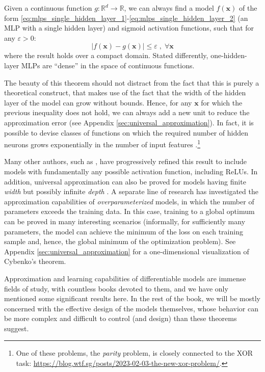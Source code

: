 \begin{theorem}
Given a continuous function $g: \mathbb{R}^d \rightarrow \mathbb{R}$, we can always find a model $f(\mathbf{x})$ of the form \eqref{eq:mlps_single_hidden_layer_1}-\eqref{eq:mlps_single_hidden_layer_2} (an MLP with a single hidden layer) and sigmoid activation functions, such that for any $\varepsilon > 0$:
%
$$
\lvert f(\mathbf{x}) - g(\mathbf{x})\rvert\le\varepsilon \;,\;\forall \mathbf{x}
$$
%
where the result holds over a compact domain. Stated differently, one-hidden-layer MLPs are “dense” in the space of continuous functions.
\end{theorem}

The beauty of this theorem should not distract from the fact that this is purely a theoretical construct, that makes use of the fact that the width of the hidden layer of the model can grow without bounds. Hence, for any $\mathbf{x}$ for which the previous inequality does not hold, we can always add a new unit to reduce the approximation error (see Appendix \ref{sec:universal_approximation}). In fact, it is possible to devise classes of functions on which the required number of hidden neurons grows exponentially in the number of input features \cite{bengio2009learning}.\footnote{One of these problems, the \textit{parity} problem, is closely connected to the XOR task: \url{https://blog.wtf.sg/posts/2023-02-03-the-new-xor-problem/}.}

Many other authors, such as \cite{hornik1991approximation}, have progressively refined this result to include models with fundamentally any possible activation function, including ReLUs. In addition, universal approximation can also be proved for models having finite \textit{width} but possibly infinite \textit{depth} \cite{lu2017expressive}. A separate line of research has investigated the approximation capabilities of \textit{overparameterized} models, in which the number of parameters exceeds the training data. In this case, training to a global optimum can be proved in many interesting scenarios \cite{du2018gradient,allen2019learning} (informally, for sufficiently many parameters, the model can achieve the minimum of the loss on each training sample and, hence, the global minimum of the optimization problem).  See Appendix \ref{sec:universal_approximation} for a one-dimensional visualization of Cybenko's theorem.

Approximation and learning capabilities of differentiable models are immense fields of study, with countless books devoted to them, and we have only mentioned some significant results here. In the rest of the book, we will be mostly concerned with the effective design of the models themselves, whose behavior can be more complex and difficult to control (and design) than these theorems suggest.

